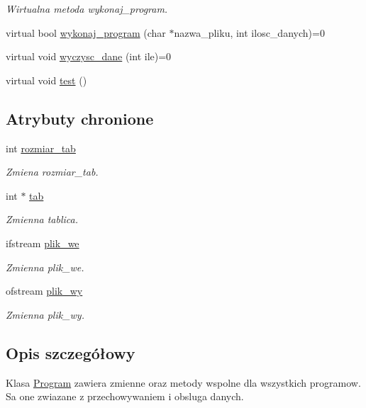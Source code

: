 \begin{DoxyCompactItemize}
\begin{DoxyCompactList}\small\item\em Wirtualna metoda wykonaj\-\_\-program. \end{DoxyCompactList}\item 
virtual bool \hyperlink{class_program_afc2ba31ffb01e8d2c6448a222fa02c8c}{wykonaj\-\_\-program} (char $\ast$nazwa\-\_\-pliku, int ilosc\-\_\-danych)=0
\item 
virtual void \hyperlink{class_program_a4f26df1d57d90eeb7095e1ef2fe4c229}{wyczysc\-\_\-dane} (int ile)=0
\item 
virtual void \hyperlink{class_program_ae866e995ea153f83031107c194f604e5}{test} ()
\end{DoxyCompactItemize}
\subsection*{Atrybuty chronione}
\begin{DoxyCompactItemize}
\item 
int \hyperlink{class_program_a3b5a10104019b9daa23ce4a5f5533820}{rozmiar\-\_\-tab}
\begin{DoxyCompactList}\small\item\em Zmiena rozmiar\-\_\-tab. \end{DoxyCompactList}\item 
int $\ast$ \hyperlink{class_program_ac72268c925315098b1632cc97d0f818a}{tab}
\begin{DoxyCompactList}\small\item\em Zmienna tablica. \end{DoxyCompactList}\item 
ifstream \hyperlink{class_program_aac2f72538e24e533c327fe5546a59210}{plik\-\_\-we}
\begin{DoxyCompactList}\small\item\em Zmienna plik\-\_\-we. \end{DoxyCompactList}\item 
ofstream \hyperlink{class_program_a59c1761a5ea875b3d5a4678928f3a1de}{plik\-\_\-wy}
\begin{DoxyCompactList}\small\item\em Zmienna plik\-\_\-wy. \end{DoxyCompactList}\end{DoxyCompactItemize}


\subsection{Opis szczegółowy}
Klasa \hyperlink{class_program}{Program} zawiera zmienne oraz metody wspolne dla wszystkich programow. Sa one zwiazane z przechowywaniem i obsluga danych. 

